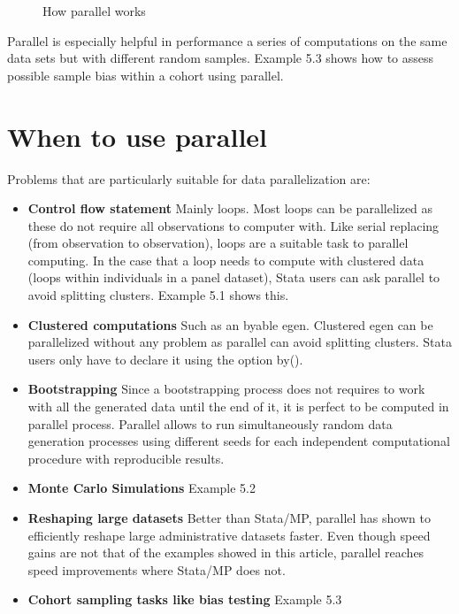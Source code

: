\documentclass[bib]{statapress}
\begin{document}
\begin{figure}[tb]
\caption{How parallel works\label{fig:howworks}}
\bigskip
\centering
\scalebox{1}{}
\end{figure}

Parallel is especially helpful in performance a series of computations on the same data sets but with different random samples. Example 5.3 shows how to assess possible sample bias within a cohort using parallel.

\pagebreak

\section{When to use parallel}

Problems that are particularly suitable for data parallelization are:

\begin{itemize}
\item {\bf Control flow statement} Mainly loops. Most loops can be parallelized as these do not require all observations to computer with. Like serial replacing (from observation to observation), loops are a suitable task to parallel computing. In the case that a loop needs to compute with clustered data (loops within individuals in a panel dataset), Stata users can ask parallel to avoid splitting clusters. Example 5.1 shows this.
\item {\bf Clustered computations} Such as an byable egen. Clustered egen can be parallelized without any problem as parallel can avoid splitting clusters. Stata users only have to declare it using the option by().
\item {\bf Bootstrapping} Since a bootstrapping process does not requires to work with all the generated data until the end of it, it is perfect to be computed in parallel process. Parallel allows to run simultaneously random data generation processes using different seeds for each independent computational procedure with reproducible results.
\item {\bf Monte Carlo Simulations} Example 5.2
\item {\bf Reshaping large datasets} Better than Stata/MP, parallel has shown to efficiently reshape large administrative datasets faster. Even though speed gains are not that of the examples showed in this article, parallel reaches speed improvements where Stata/MP does not. 
\item {\bf Cohort sampling tasks like bias testing} Example 5.3
\end{itemize}
\end{document}
